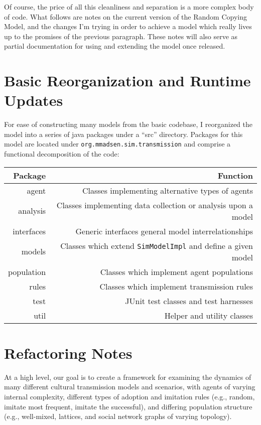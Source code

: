 \documentclass{kluwer-mem-copyright}
\begin{document}
\begin{article}
Of course, the price of all this cleanliness and separation is a more complex
body of code.  What follows are notes on the current version of the Random
Copying Model, and the changes I'm trying in order to achieve a model which
really lives up to the promises of the previous paragraph.  These notes will
also serve as partial documentation for using and extending the model once
released.  

\section{Basic Reorganization and Runtime Updates}
For ease of constructing many models from the basic codebase, I reorganized the
model into a series of java packages under a ``src'' directory.  Packages for
this model are located under \texttt{org.mmadsen.sim.transmission} and comprise
a functional decomposition of the code:\\
\begin{tabular}{|r|r|}
\hline
Package&Function\\
\hline
agent&Classes implementing alternative types of agents\\
analysis&Classes implementing data collection or analysis upon a model\\
interfaces&Generic interfaces general model interrelationships\\
models&Classes which extend \texttt{SimModelImpl} and define a given model\\
population&Classes which implement agent populations\\ 
rules&Classes which implement transmission rules\\
test&JUnit test classes and test harnesses \\
util&Helper and utility classes\\
\hline
\end{tabular}


\section{Refactoring Notes}
At a high level, our goal is to create a framework for examining the dynamics of
many different cultural transmission models and scenarios, with agents of
varying internal complexity, different types of adoption and imitation rules
(e.g., random, imitate most frequent, imitate the successful), and differing
population structure (e.g., well-mixed, lattices, and social network graphs of
varying topology).  


\end{article}
\end{document}
